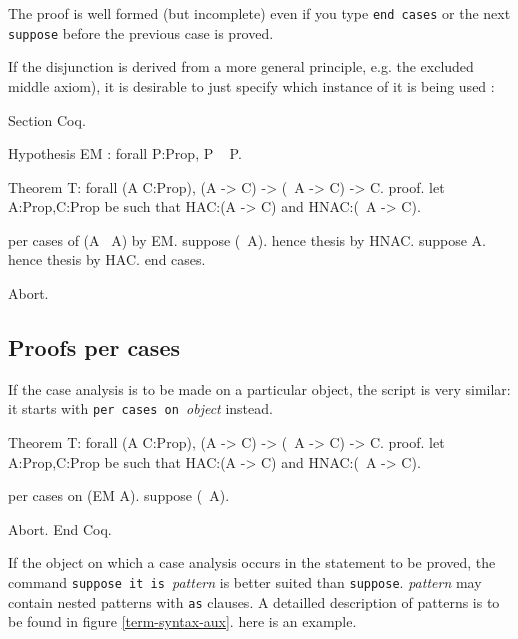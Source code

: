 The proof is well formed (but incomplete) even if you type {\tt end
 cases} or the next {\tt suppose} before the previous case is proved.

If the disjunction is derived from a more general principle, e.g. the
excluded middle axiom), it is desirable to just specify which instance
of it is being used :

\begin{coq_eval}
Section Coq.
\end{coq_eval}
\begin{coq_example}
Hypothesis EM : forall P:Prop, P \/ ~ P.
\end{coq_example} 
\begin{coq_eval}
Theorem T: forall (A C:Prop), (A -> C) -> (~A -> C) -> C.
proof.
let A:Prop,C:Prop be such that HAC:(A -> C) and HNAC:(~A -> C).
\end{coq_eval} 
\begin{coq_example}
per cases of (A \/ ~A) by EM.
suppose (~A).
  hence thesis by HNAC.
suppose A.
  hence thesis by HAC.
end cases.
\end{coq_example}
\begin{coq_eval}
Abort.
\end{coq_eval}

\subsection{Proofs per cases}

If the case analysis is to be made on a particular object, the script
is very similar: it starts with {\tt per cases on }\emph{object} instead.

\begin{coq_eval}
Theorem T: forall (A C:Prop), (A -> C) -> (~A -> C) -> C.
proof.
let A:Prop,C:Prop be such that HAC:(A -> C) and HNAC:(~A -> C).
\end{coq_eval} 
\begin{coq_example}
per cases on (EM A).
suppose (~A).
\end{coq_example}
\begin{coq_eval}
Abort.
End Coq.
\end{coq_eval}

If the object on which a case analysis occurs in the statement to be
proved, the command {\tt suppose it is }\emph{pattern} is better
suited than {\tt suppose}. \emph{pattern} may contain nested patterns
with {\tt as} clauses. A detailled description of patterns is to be
found in figure \ref{term-syntax-aux}. here is an example.


